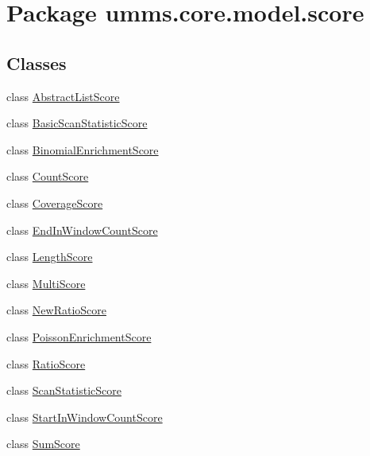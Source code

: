 \hypertarget{namespaceumms_1_1core_1_1model_1_1score}{\section{Package umms.\+core.\+model.\+score}
\label{namespaceumms_1_1core_1_1model_1_1score}
}
\subsection*{Classes}
\begin{DoxyCompactItemize}
\item 
class \hyperlink{classumms_1_1core_1_1model_1_1score_1_1_abstract_list_score}{Abstract\+List\+Score}
\item 
class \hyperlink{classumms_1_1core_1_1model_1_1score_1_1_basic_scan_statistic_score}{Basic\+Scan\+Statistic\+Score}
\item 
class \hyperlink{classumms_1_1core_1_1model_1_1score_1_1_binomial_enrichment_score}{Binomial\+Enrichment\+Score}
\item 
class \hyperlink{classumms_1_1core_1_1model_1_1score_1_1_count_score}{Count\+Score}
\item 
class \hyperlink{classumms_1_1core_1_1model_1_1score_1_1_coverage_score}{Coverage\+Score}
\item 
class \hyperlink{classumms_1_1core_1_1model_1_1score_1_1_end_in_window_count_score}{End\+In\+Window\+Count\+Score}
\item 
class \hyperlink{classumms_1_1core_1_1model_1_1score_1_1_length_score}{Length\+Score}
\item 
class \hyperlink{classumms_1_1core_1_1model_1_1score_1_1_multi_score}{Multi\+Score}
\item 
class \hyperlink{classumms_1_1core_1_1model_1_1score_1_1_new_ratio_score}{New\+Ratio\+Score}
\item 
class \hyperlink{classumms_1_1core_1_1model_1_1score_1_1_poisson_enrichment_score}{Poisson\+Enrichment\+Score}
\item 
class \hyperlink{classumms_1_1core_1_1model_1_1score_1_1_ratio_score}{Ratio\+Score}
\item 
class \hyperlink{classumms_1_1core_1_1model_1_1score_1_1_scan_statistic_score}{Scan\+Statistic\+Score}
\item 
class \hyperlink{classumms_1_1core_1_1model_1_1score_1_1_start_in_window_count_score}{Start\+In\+Window\+Count\+Score}
\item 
class \hyperlink{classumms_1_1core_1_1model_1_1score_1_1_sum_score}{Sum\+Score}

\end{DoxyCompactItemize}

